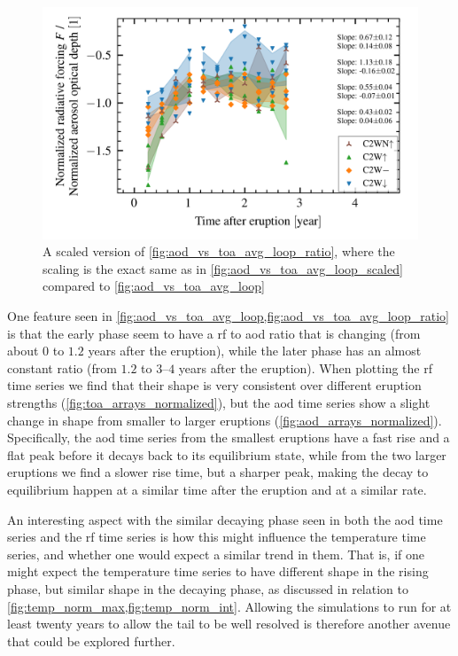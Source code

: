 \documentclass{ametsocV5}
\begin{document}
\begin{figure}[t]
  \begin{center}
    \includegraphics[width=0.95\linewidth]{figures/aod_vs_toa_avg_loop_ratio_scaled.png}
  \end{center}
  \caption{
    A scaled version of \cref{fig:aod_vs_toa_avg_loop_ratio}, where the scaling is the
    exact same as in \cref{fig:aod_vs_toa_avg_loop_scaled} compared to
    \cref{fig:aod_vs_toa_avg_loop}
  }%
  \label{fig:aod_vs_toa_avg_loop_ratio_scaled}
\end{figure}

One feature seen in \cref{fig:aod_vs_toa_avg_loop,fig:aod_vs_toa_avg_loop_ratio} is that
the early phase seem to have a \acrshort{rf} to \acrshort{aod} ratio that is changing
(from about \( 0 \) to \( 1.2 \) years after the eruption), while the later phase has an
almost constant ratio (from \( 1.2 \) to \( 3 \)--\( 4 \) years after the eruption).
When plotting the \acrshort{rf} time series we find that their shape is very consistent
over different eruption strengths (\cref{fig:toa_arrays_normalized}), but the
\acrshort{aod} time series show a slight change in shape from smaller to larger
eruptions (\cref{fig:aod_arrays_normalized}). Specifically, the \acrshort{aod} time
series from the smallest eruptions have a fast rise and a flat peak before it decays
back to its equilibrium state, while from the two larger eruptions we find a slower rise
time, but a sharper peak, making the decay to equilibrium happen at a similar time after
the eruption and at a similar rate.

An interesting aspect with the similar decaying phase seen in both the \acrshort{aod}
time series and the \acrshort{rf} time series is how this might influence the
temperature time series, and whether one would expect a similar trend in them. That is,
if one might expect the temperature time series to have different shape in the rising
phase, but similar shape in the decaying phase, as discussed in relation to
\cref{fig:temp_norm_max,fig:temp_norm_int}. Allowing the simulations to run for at least
twenty years to allow the tail to be well resolved is therefore another avenue that
could be explored further.
\end{document}
